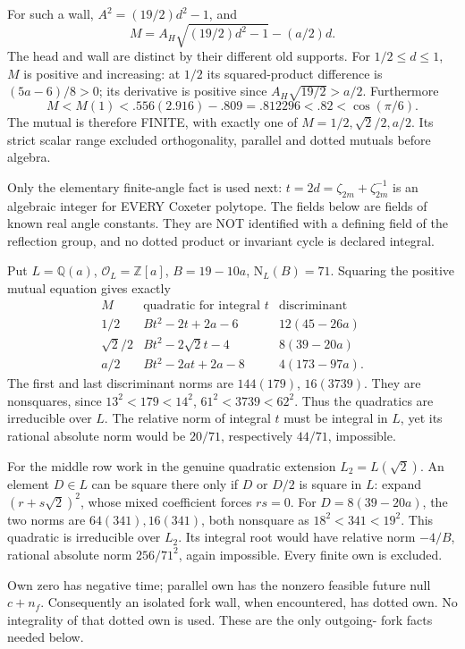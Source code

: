 \documentclass[11pt]{article}
\theoremstyle{definition}
\theoremstyle{remark}
\begin{document}
For such a wall,
\(A^2=(19/2)d^2-1\), and
\[
                     M=A_H\sqrt{(19/2)d^2-1}-(a/2)d .
\]
The head and wall are distinct
by their different old supports.
For \(1/2\le d\le1\), \(M\)
is positive and increasing:
at \(1/2\) its squared-product
difference is \((5a-6)/8>0\);
its derivative is positive since
\(A_H\sqrt{19/2}>a/2\).
Furthermore
\[
                    M<M(1)<.556(2.916)-.809
                              =.812296<.82<\cos(\pi/6).
\]
The mutual is therefore FINITE,
with exactly one of
\(M=1/2,\sqrt2/2,a/2\).
Its strict scalar range excluded
orthogonality, parallel and
dotted mutuals before algebra.

Only the elementary finite-angle
fact is used next:
\(t=2d=\zeta_{2m}+\zeta_{2m}^{-1}\)
is an algebraic integer for
EVERY Coxeter polytope.
The fields below are fields of
known real angle constants.
They are NOT identified with
a defining field of the reflection
group, and no dotted product
or invariant cycle is declared
integral.

Put \(L=\mathbb Q(a)\),
\(\mathcal O_L=\mathbb Z[a]\),
\(B=19-10a\), \(\mathrm N_L(B)=71\).
Squaring the positive mutual
equation gives exactly
\[
\begin{array}{c|c|c}
 M&\text{quadratic for integral }t&\text{discriminant}\\ \hline
 1/2&Bt^2-2t+2a-6&12(45-26a)\\
 \sqrt2/2&Bt^2-2\sqrt2t-4&8(39-20a)\\
 a/2&Bt^2-2at+2a-8&4(173-97a).
\end{array}
\]
The first and last discriminant
norms are \(144(179)\), \(16(3739)\).
They are nonsquares, since
\(13^2<179<14^2\),
\(61^2<3739<62^2\).
Thus the quadratics are
irreducible over \(L\).
The relative norm of integral
\(t\) must be integral in \(L\),
yet its rational absolute norm
would be \(20/71\), respectively
\(44/71\), impossible.

For the middle row work in the
genuine quadratic extension
\(L_2=L(\sqrt2)\).
An element \(D\in L\) can be
square there only if \(D\) or
\(D/2\) is square in \(L\):
expand \((r+s\sqrt2)^2\), whose
mixed coefficient forces \(rs=0\).
For \(D=8(39-20a)\), the two
norms are \(64(341),16(341)\),
both nonsquare as
\(18^2<341<19^2\).
This quadratic is irreducible
over \(L_2\).
Its integral root would have
relative norm \(-4/B\), rational
absolute norm \(256/71^2\),
again impossible.
Every finite own is excluded.

Own zero has negative time;
parallel own has the nonzero
feasible future null \(c+n_f\).
Consequently an isolated fork
wall, when encountered, has
dotted own.
No integrality of that dotted
own is used.
These are the only outgoing-
fork facts needed below.
\end{document}
